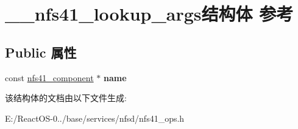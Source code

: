 \hypertarget{struct____nfs41__lookup__args}{}\section{\+\_\+\+\_\+nfs41\+\_\+lookup\+\_\+args结构体 参考}
\label{struct____nfs41__lookup__args}
\subsection*{Public 属性}
\begin{DoxyCompactItemize}
\item 
\mbox{\label{struct____nfs41__lookup__args_a77982d970c96495f7b2f0a2459fd0c42}} 
const \hyperlink{struct____nfs41__component}{nfs41\+\_\+component} $\ast$ {\bfseries name}
\end{DoxyCompactItemize}


该结构体的文档由以下文件生成\+:\begin{DoxyCompactItemize}
\item 
E\+:/\+React\+O\+S-\/0../base/services/nfsd/nfs41\+\_\+ops.\+h\end{DoxyCompactItemize}
